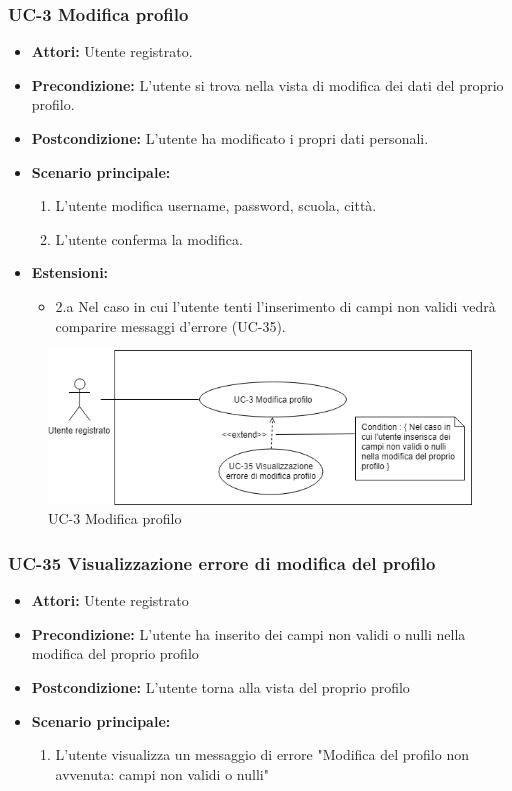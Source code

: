 \subsubsection{UC-3 Modifica profilo}
		\begin{itemize}
			\item \textbf{Attori:} Utente registrato.
			\item \textbf{Precondizione:} L'utente si trova nella vista di modifica dei dati del proprio profilo.
			\item \textbf{Postcondizione:} L'utente ha modificato i propri dati personali.
			\item \textbf{Scenario principale:}
				\begin{enumerate}
					\item L'utente modifica username, password, scuola, città.
					\item L'utente conferma la modifica. 
				\end{enumerate}
				\item \textbf{Estensioni:}
				\begin{itemize}
					\item 2.a Nel caso in cui l'utente tenti l'inserimento di campi non validi vedrà comparire messaggi d'errore (UC-35).
				\end{itemize}
		\end{itemize}
		\begin{figure}[htbp]
			\centering
			\includegraphics[scale=0.7]{images/UC-3.png}
			\caption{UC-3 Modifica profilo}
		\end{figure}
	
\subsubsection{UC-35 Visualizzazione errore di modifica del profilo}	
	\begin{itemize}
		\item \textbf{Attori:} Utente registrato
		\item \textbf{Precondizione:} L'utente ha inserito dei campi non validi o nulli nella modifica del proprio profilo
		\item \textbf{Postcondizione:} L'utente torna alla vista del proprio profilo
		\item \textbf{Scenario principale:}
		\begin{enumerate}
			\item L'utente visualizza un messaggio di errore "Modifica del profilo non avvenuta: campi non validi o nulli"
		\end{enumerate}
	\end{itemize}
	
